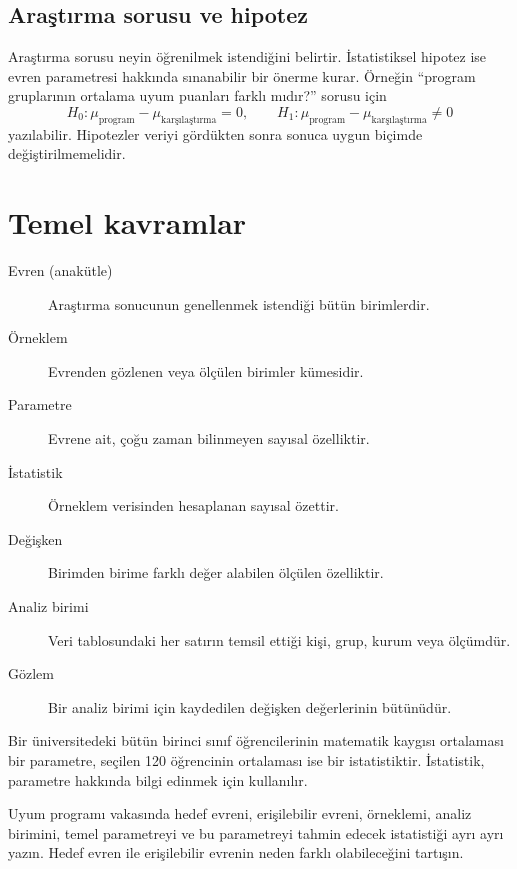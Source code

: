 \subsection{Araştırma sorusu ve hipotez}

Araştırma sorusu neyin öğrenilmek istendiğini belirtir. İstatistiksel hipotez
ise evren parametresi hakkında sınanabilir bir önerme kurar. Örneğin
``program gruplarının ortalama uyum puanları farklı mıdır?'' sorusu için
\[
H_0:\mu_{\text{program}}-\mu_{\text{karşılaştırma}}=0,
\qquad
H_1:\mu_{\text{program}}-\mu_{\text{karşılaştırma}}\ne0
\]
yazılabilir. Hipotezler veriyi gördükten sonra sonuca uygun biçimde
değiştirilmemelidir.

\section{Temel kavramlar}

\begin{description}
  \item[Evren (anakütle)] Araştırma sonucunun genellenmek istendiği bütün birimlerdir.
  \item[Örneklem] Evrenden gözlenen veya ölçülen birimler kümesidir.
  \item[Parametre] Evrene ait, çoğu zaman bilinmeyen sayısal özelliktir.
  \item[İstatistik] Örneklem verisinden hesaplanan sayısal özettir.
  \item[Değişken] Birimden birime farklı değer alabilen ölçülen özelliktir.
  \item[Analiz birimi] Veri tablosundaki her satırın temsil ettiği kişi, grup, kurum veya ölçümdür.
  \item[Gözlem] Bir analiz birimi için kaydedilen değişken değerlerinin bütünüdür.
\end{description}

Bir üniversitedeki bütün birinci sınıf öğrencilerinin matematik kaygısı
ortalaması bir parametre, seçilen 120 öğrencinin ortalaması ise bir
istatistiktir. İstatistik, parametre hakkında bilgi edinmek için kullanılır.

\begin{etkinlik}
Uyum programı vakasında hedef evreni, erişilebilir evreni, örneklemi, analiz
birimini, temel parametreyi ve bu parametreyi tahmin edecek istatistiği ayrı
ayrı yazın. Hedef evren ile erişilebilir evrenin neden farklı olabileceğini
tartışın.
\end{etkinlik}

